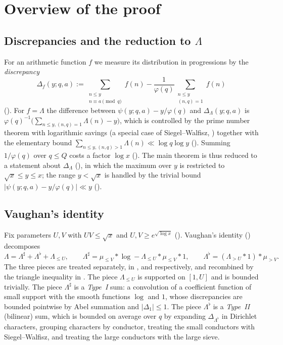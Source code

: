 \chapter{Overview of the proof}\label{ch:overview}

\section{Discrepancies and the reduction to \texorpdfstring{$\Lambda$}{Lambda}}
For an arithmetic function $f$ we measure its distribution in progressions by the
\emph{discrepancy}
$$\Delta_f(y; q, a) := \sum_{\substack{n \le y \\ n \equiv a \pmod q}} f(n) - \frac{1}{\varphi(q)} \sum_{\substack{n \le y \\ (n,q) = 1}} f(n)$$
(). For $f = \Lambda$ the difference between $\psi(y; q, a) - y/\varphi(q)$ and
$\Delta_\Lambda(y; q, a)$ is $\varphi(q)^{-1}\big(\sum_{n \le y, (n,q)=1} \Lambda(n) - y\big)$, which is
controlled by the prime number theorem with logarithmic savings (a special case of Siegel--Walfisz,
) together with the elementary bound $\sum_{n \le y, (n,q) > 1} \Lambda(n) \ll \log q \log y$
(). Summing $1/\varphi(q)$ over $q \le Q$ costs a factor $\log x$
(). The main theorem is thus reduced to a statement about $\Delta_\Lambda$
(), in which the maximum over $y$ is restricted to $\sqrt x \le y \le x$; the
range $y < \sqrt x$ is handled by the trivial bound $|\psi(y;q,a) - y/\varphi(q)| \ll y$
().

\section{Vaughan's identity}
Fix parameters $U, V$ with $UV \le \sqrt x$ and $U, V \ge e^{\sqrt{\log x}}$ ().
Vaughan's identity () decomposes
$$\Lambda = \Lambda^\sharp + \Lambda^\flat + \Lambda_{\le U}, \qquad
\Lambda^\sharp = \mu_{\le V} * \log - \Lambda_{\le U} * \mu_{\le V} * 1, \qquad
\Lambda^\flat = (\Lambda_{> U} * 1) * \mu_{> V} .$$
The three pieces are treated separately, in ,  and 
respectively, and recombined by the triangle inequality in . The piece
$\Lambda_{\le U}$ is supported on $[1, U]$ and is bounded trivially. The piece $\Lambda^\sharp$ is a
\emph{Type~I} sum: a convolution of a coefficient function of small support with the smooth functions
$\log$ and $1$, whose discrepancies are bounded pointwise by Abel summation and $|\Delta_1| \le 1$.
The piece $\Lambda^\flat$ is a \emph{Type~II} (bilinear) sum, which is bounded on average over $q$ by
expanding $\Delta_{\Lambda^\flat}$ in Dirichlet characters, grouping characters by conductor,
treating the small conductors with Siegel--Walfisz, and treating the large conductors with the large
sieve.

